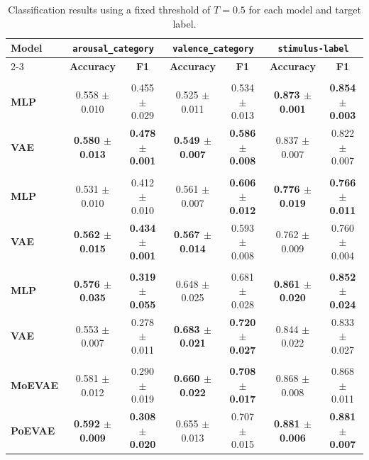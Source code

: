 \begin{table}[H]
\centering
\scriptsize
\setlength{\tabcolsep}{4pt}
\caption{Classification results using a fixed threshold of $T=0.5$ for each model and target label.}
\label{tab:results_grouped_fixed_threshold}
\begin{tabular}{lcccccc}
\hline
\textbf{Model} & \multicolumn{2}{c}{\textbf{\texttt{arousal\_category}}} & \multicolumn{2}{c}{\textbf{\texttt{valence\_category}}} & \multicolumn{2}{c}{\textbf{\texttt{stimulus-label}}} \\
\cline{2-3}\cline{4-5}\cline{6-7}
 & \textbf{Accuracy} & \textbf{F1} & \textbf{Accuracy} & \textbf{F1} & \textbf{Accuracy} & \textbf{F1} \\
\hline
\rowcolor{EDABlue}\multicolumn{7}{l}{\textbf{EDA}} \\
\textbf{MLP} & 0.558 $\pm$ 0.010 & 0.455 $\pm$ 0.029 & 0.525 $\pm$ 0.011 & 0.534 $\pm$ 0.013 & \textbf{0.873 $\pm$ 0.001} & \textbf{0.854 $\pm$ 0.003} \\
\textbf{VAE} & \textbf{0.580 $\pm$ 0.013} & \textbf{0.478 $\pm$ 0.001} & \textbf{0.549 $\pm$ 0.007} & \textbf{0.586 $\pm$ 0.008} & 0.837 $\pm$ 0.007 & 0.822 $\pm$ 0.007 \\
\hline
\rowcolor{PPGGreen}\multicolumn{7}{l}{\textbf{PPG}} \\
\textbf{MLP} & 0.531 $\pm$ 0.010 & 0.412 $\pm$ 0.010 & 0.561 $\pm$ 0.007 & \textbf{0.606 $\pm$ 0.012} & \textbf{0.776 $\pm$ 0.019} & \textbf{0.766 $\pm$ 0.011} \\
\textbf{VAE} & \textbf{0.562 $\pm$ 0.015} & \textbf{0.434 $\pm$ 0.001} & \textbf{0.567 $\pm$ 0.014} & 0.593 $\pm$ 0.008 & 0.762 $\pm$ 0.009 & 0.760 $\pm$ 0.004 \\
\hline
\rowcolor{TEXTOrange}\multicolumn{7}{l}{\textbf{TEXT}} \\
\textbf{MLP} & \textbf{0.576 $\pm$ 0.035} & \textbf{0.319 $\pm$ 0.055} & 0.648 $\pm$ 0.025 & 0.681 $\pm$ 0.028 & \textbf{0.861 $\pm$ 0.020} & \textbf{0.852 $\pm$ 0.024} \\
\textbf{VAE} & 0.553 $\pm$ 0.007 & 0.278 $\pm$ 0.011 & \textbf{0.683 $\pm$ 0.021} & \textbf{0.720 $\pm$ 0.027} & 0.844 $\pm$ 0.022 & 0.833 $\pm$ 0.027 \\
\hline
\rowcolor{gray!20}\multicolumn{7}{l}{\textbf{EDA+TEXT}} \\
\textbf{MoEVAE} & 0.581 $\pm$ 0.012 & 0.290 $\pm$ 0.019 & \textbf{0.660 $\pm$ 0.022} & \textbf{0.708 $\pm$ 0.017} & 0.868 $\pm$ 0.008 & 0.868 $\pm$ 0.011 \\
\textbf{PoEVAE} & \textbf{0.592 $\pm$ 0.009} & \textbf{0.308 $\pm$ 0.020} & 0.655 $\pm$ 0.013 & 0.707 $\pm$ 0.015 & \textbf{0.881 $\pm$ 0.006} & \textbf{0.881 $\pm$ 0.007} \\

\end{tabular}
\end{table}
